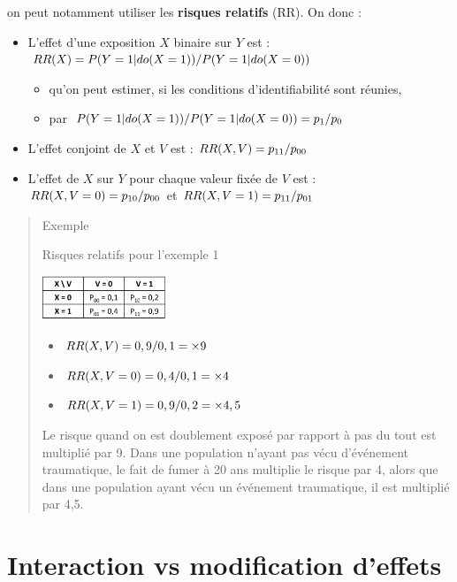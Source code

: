 \documentclass[
]{book}
\providecommand{\tightlist}{%
  \setlength{\itemsep}{0pt}\setlength{\parskip}{0pt}}
\begin{document}
on peut notamment utiliser les \textbf{risques relatifs} (RR). On donc :

\begin{itemize}
\tightlist
\item
  L'effet d'une exposition \(X\) binaire sur \(Y\) est : \(\small RR(X) = P(Y = 1| do(X = 1)) / P(Y = 1|do(X = 0))\)

  \begin{itemize}
  \tightlist
  \item
    qu'on peut estimer, si les conditions d'identifiabilité sont réunies,
  \item
    par \(\small P(Y = 1| do(X = 1)) / P(Y = 1|do(X = 0))= p_1 / p_0\)
  \end{itemize}
\item
  L'effet conjoint de \(X\) et \(V\) est : \(\small RR(X,V) = p_{11}/p_{00}\)
\item
  L'effet de \(X\) sur \(Y\) pour chaque valeur fixée de \(V\) est : \(\small RR(X,V=0) = p_{10}/p_{00}\) et \(\small RR(X,V=1) =p_{11}/p_{01}\)
\end{itemize}

\begin{quote}
Exemple

Risques relatifs pour l'exemple 1

\includegraphics[width=0.3\textwidth,height=\textheight]{img/Image1.png}

\begin{itemize}
\tightlist
\item
  \(\small RR(X,V) = 0,9/0,1 = \times 9\)
\item
  \(\small RR(X,V=0) = 0,4/0,1 = \times 4\)
\item
  \(\small RR(X,V=1) = 0,9/0,2 = \times 4,5\)
\end{itemize}

Le risque quand on est doublement exposé par rapport à pas du tout est multiplié par 9. Dans une population n'ayant pas vécu d'événement traumatique, le fait de fumer à 20 ans multiplie le risque par 4, alors que dans une population ayant vécu un événement traumatique, il est multiplié par 4,5.
\end{quote}

\hypertarget{intmodif}{%
\chapter{Interaction vs modification d'effets}\label{intmodif}}
\end{document}

